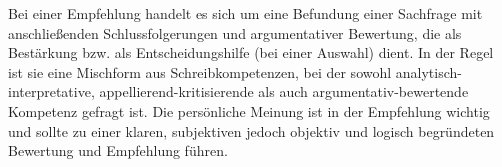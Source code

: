 



\thispagestyle{plain}



Bei einer Empfehlung handelt es sich um eine Befundung einer Sachfrage mit anschlie\ss{}enden Schlussfolgerungen und argumentativer Bewertung, die als Best\"{a}rkung bzw. als Entscheidungshilfe (bei einer Auswahl) dient. In der Regel ist sie eine Mischform aus Schreibkompetenzen, bei der sowohl analytisch-interpretative, appellierend-kritisierende als auch argumentativ-bewertende Kompetenz gefragt ist. Die pers\"{o}nliche Meinung ist in der Empfehlung wichtig und sollte zu einer klaren, subjektiven jedoch objektiv und logisch begr\"{u}ndeten Bewertung und Empfehlung f\"{u}hren.


